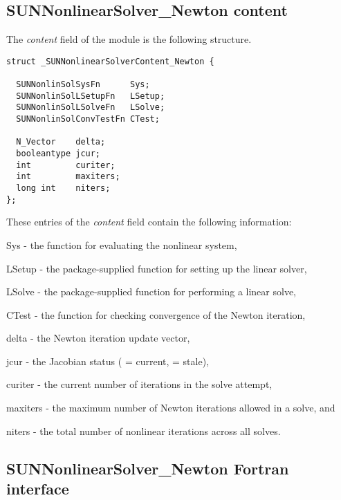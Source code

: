 \subsection{SUNNonlinearSolver\_Newton content}
\label{ss:sunnonlinsolnewton_content}

The \textit{content} field of the {\sunnonlinsolnewton} module is the
following structure.
\begin{verbatim}
struct _SUNNonlinearSolverContent_Newton {

  SUNNonlinSolSysFn      Sys;
  SUNNonlinSolLSetupFn   LSetup;
  SUNNonlinSolLSolveFn   LSolve;
  SUNNonlinSolConvTestFn CTest;

  N_Vector    delta;
  booleantype jcur;
  int         curiter;
  int         maxiters;
  long int    niters;
};
\end{verbatim}
These entries of the \emph{content} field contain the following
information:
\begin{args}[maxiters]
  \item[Sys]      - the function for evaluating the nonlinear system,
  \item[LSetup]   - the package-supplied function for setting up the linear solver,
  \item[LSolve]   - the package-supplied function for performing a linear solve,
  \item[CTest]    - the function for checking convergence of the Newton
                    iteration,
  \item[delta]    - the Newton iteration update vector,
  \item[jcur]     - the Jacobian status ( = current,
                     = stale),
  \item[curiter]  - the current number of iterations in the solve attempt,
  \item[maxiters] - the maximum number of Newton iterations allowed in
                    a solve, and
  \item[niters]   - the total number of nonlinear iterations across all
                    solves.
\end{args}


\subsection{SUNNonlinearSolver\_Newton Fortran interface}
\label{ss:sunnonlinsolnewton_fortran}

